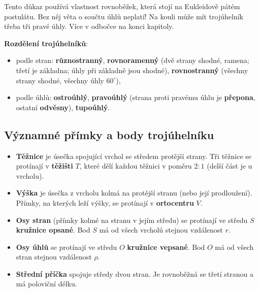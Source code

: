 \begin{note}
  Tento důkaz používá vlastnost rovnoběžek, která stojí na Eukleidově pátém postulátu. Bez něj věta o součtu úhlů neplatí! Na kouli může mít trojúhelník třeba tři pravé úhly. Více v odbočce na konci kapitoly.
\end{note}

\begin{definitionbox}
  \textbf{Rozdělení trojúhelníků}:
  \begin{itemize}
    \item podle stran: \textbf{různostranný}, \textbf{rovnoramenný} (dvě strany shodné, ramena; třetí je základna; úhly při základně jsou shodné), \textbf{rovnostranný} (všechny strany shodné, všechny úhly $60^\circ$),
    \item podle úhlů: \textbf{ostroúhlý}, \textbf{pravoúhlý} (strana proti pravému úhlu je \textbf{přepona}, ostatní \textbf{odvěsny}), \textbf{tupoúhlý}.
  \end{itemize}
\end{definitionbox}

\subsection{Významné přímky a body trojúhelníku}\label{sec:vyznamne-body}

\begin{definitionbox}
  \begin{itemize}
    \item \textbf{Těžnice} je úsečka spojující vrchol se středem protější strany. Tři těžnice se protínají v \textbf{těžišti} $T$, které dělí každou těžnici v poměru $2:1$ (delší část je u vrcholu).
    \item \textbf{Výška} je úsečka z vrcholu kolmá na protější stranu (nebo její prodloužení). Přímky, na kterých leží výšky, se protínají v \textbf{ortocentru} $V$.
    \item \textbf{Osy stran} (přímky kolmé na stranu v jejím středu) se protínají ve středu $S$ \textbf{kružnice opsané}. Bod $S$ má od všech vrcholů stejnou vzdálenost $r$.
    \item \textbf{Osy úhlů} se protínají ve středu $O$ \textbf{kružnice vepsané}. Bod $O$ má od všech stran stejnou vzdálenost $\rho$.
    \item \textbf{Střední příčka} spojuje středy dvou stran. Je rovnoběžná se třetí stranou a má poloviční délku.
  \end{itemize}
\end{definitionbox}

